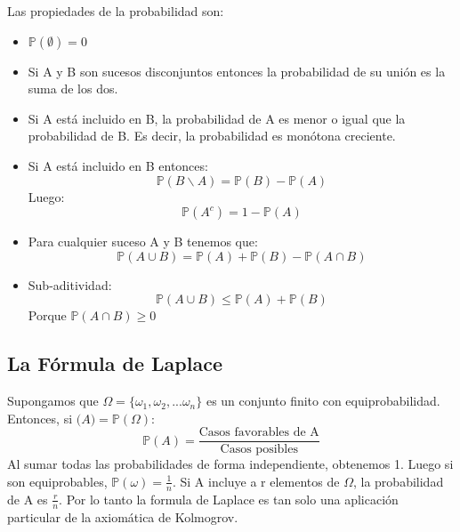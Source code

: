 \documentclass[11pt]{article}
\newcommand{\prob}{\mathbb{P}}
\theoremstyle{plain}
\begin{document}
                Las propiedades de la probabilidad son:
                \begin{itemize}
                    \item $\prob(\emptyset) = 0$
                    \item Si A y B son sucesos disconjuntos entonces la probabilidad de su unión es la suma de los dos.
                    \item Si A está incluido en B, la probabilidad de A es menor o igual que la probabilidad de B. Es decir, la probabilidad es monótona creciente.
                    \item Si A está incluido en B entonces:
                    \begin{equation}
                         \mathbb{P}(B \backslash A) = \mathbb{P}(B) - \mathbb{P}(A)
                     \end{equation}
                     Luego:
                     \begin{equation}\label{eq:8}
                         \mathbb{P}(A^c) = 1 - \mathbb{P}(A)
                     \end{equation}
                    \item Para cualquier suceso A y B tenemos que:
                    \begin{equation}
                         \mathbb{P}(A \cup B) = \mathbb{P}(A) + \mathbb{P}(B) - \mathbb{P} (A \cap B)
                    \end{equation}
                    \item Sub-aditividad:
                    \begin{equation}
                        \mathbb{P}(A \cup B) \le \mathbb{P}(A) + \mathbb{P}(B)
                    \end{equation}
                    Porque $\mathbb{P}(A\cap B) \ge 0$
                \end{itemize}
            \subsection{La Fórmula de Laplace} %
            \label{sub:la_fórmula_de_laplace}
                Supongamos que $\varOmega = \{\omega_1,\omega_2,...\omega_{n}\}$ es un conjunto finito con equiprobabilidad. Entonces, si $\mathcal(A) = \mathbb{P}(\varOmega)$:
                \begin{equation}
                    \mathbb{P}(A) = \frac{\text{Casos favorables de A}}{\text{Casos posibles}}
                \end{equation}
                Al sumar todas las probabilidades de forma independiente, obtenemos 1. Luego si son equiprobables, $\mathbb{P}(\omega) = \frac{1}{n}$. Si A incluye a r elementos de $\varOmega$, la probabilidad de A es $\frac{r}{n}$. Por lo tanto la formula de Laplace es tan solo una aplicación particular de la axiomática de Kolmogrov. 
\end{document}

